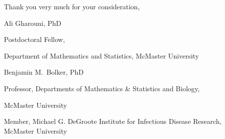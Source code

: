 \documentclass[12pt,letterpaper]{letter}
\begin{document}
Thank you very much for your consideration,

\begin{flushleft}
\footnotesize

Ali Gharouni, PhD
\setlength{\parskip}{0em}

Postdoctoral Fellow, 

Department of Mathematics and Statistics, McMaster University

\vspace{1em}

Benjamin M.\ Bolker, PhD

Professor, Departments of Mathematics \& Statistics and Biology, 

McMaster University

Member, Michael G. DeGroote Institute for Infectious Disease Research, McMaster University
\end{flushleft}

\thispagestyle{empty}
\end{document}
